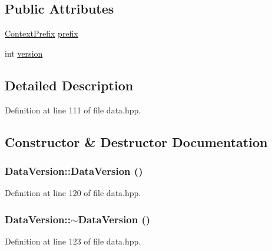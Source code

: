 \subsection*{Public Attributes}
\begin{DoxyCompactItemize}
\item 
\hyperlink{struct_context_prefix}{ContextPrefix} \hyperlink{struct_data_version_a8ec5ea0ad23078789d890065f3845afb}{prefix}
\item 
int \hyperlink{struct_data_version_a7cb16122eaf6066df7eb0fff6687fead}{version}
\end{DoxyCompactItemize}


\subsection{Detailed Description}


Definition at line 111 of file data.hpp.

\subsection{Constructor \& Destructor Documentation}
\hypertarget{struct_data_version_a8d3b825f579e947bf68f63649d246942}{
\subsubsection[{DataVersion}]{\setlength{\rightskip}{0pt plus 5cm}DataVersion::DataVersion ()}}
\label{struct_data_version_a8d3b825f579e947bf68f63649d246942}


Definition at line 120 of file data.hpp.\hypertarget{struct_data_version_a2e6f550927276f1dd15a0c1631fce5c6}{
\subsubsection[{$\sim$DataVersion}]{\setlength{\rightskip}{0pt plus 5cm}DataVersion::$\sim$DataVersion ()}}
\label{struct_data_version_a2e6f550927276f1dd15a0c1631fce5c6}


Definition at line 123 of file data.hpp.

